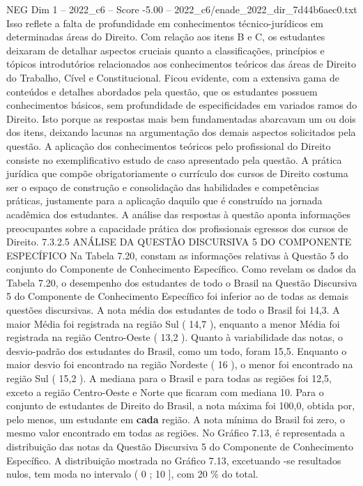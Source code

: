 \begin{textsample}{NEG Dim 1 – 2022\_c6 – Score -5.00 – 2022\_c6/enade\_2022\_dir\_7d44b6aec0.txt}
Isso reflete a falta de profundidade em conhecimentos técnico-jurídicos em determinadas áreas do Direito.
Com relação aos itens B e C, os estudantes deixaram de detalhar aspectos cruciais quanto a classificações, princípios e tópicos introdutórios relacionados aos conhecimentos teóricos das áreas de Direito do Trabalho, Cível e Constitucional.
Ficou evidente, com a extensiva gama de conteúdos e detalhes abordados pela questão, que os estudantes possuem conhecimentos básicos, sem profundidade de especificidades em variados ramos do Direito.
Isto porque as respostas mais bem fundamentadas abarcavam um ou dois dos itens, deixando lacunas na argumentação dos demais aspectos solicitados pela questão.
A aplicação dos conhecimentos teóricos pelo profissional do Direito consiste no exemplificativo estudo de caso apresentado pela questão.
A prática jurídica que compõe obrigatoriamente o currículo dos cursos de Direito costuma ser o espaço de construção e consolidação das habilidades e competências práticas, justamente para a aplicação daquilo que é construído na jornada acadêmica dos estudantes.
A análise das respostas à questão aponta informações preocupantes sobre a capacidade prática dos profissionais egressos dos cursos de Direito. 7.3.2.5 ANÁLISE DA QUESTÃO DISCURSIVA 5 DO COMPONENTE ESPECÍFICO Na Tabela 7.20, constam as informações relativas à Questão 5 do conjunto do Componente de Conhecimento Específico.
Como revelam os dados da Tabela 7.20, o desempenho dos estudantes de todo o Brasil na Questão Discursiva 5 do Componente de Conhecimento Específico foi inferior ao de todas as demais questões discursivas.
A nota média dos estudantes de todo o Brasil foi 14,3.
A maior Média foi registrada na região Sul ( 14,7 ), enquanto a menor Média foi registrada na região Centro-Oeste ( 13,2 ).
Quanto à variabilidade das notas, o desvio-padrão dos estudantes do Brasil, como um todo, foram 15,5.
Enquanto o maior desvio foi encontrado na região Nordeste ( 16 ), o menor foi encontrado na região Sul ( 15,2 ).
A mediana para o Brasil e para todas as regiões foi 12,5, exceto a região Centro-Oeste e Norte que ficaram com mediana 10.
Para o conjunto de estudantes de Direito do Brasil, a nota máxima foi 100,0, obtida por, pelo menos, um estudante em \textbf{cada} região.
A nota mínima do Brasil foi zero, o mesmo valor encontrado em todas as regiões.
No Gráfico 7.13, é representada a distribuição das notas da Questão Discursiva 5 do Componente de Conhecimento Específico.
A distribuição mostrada no Gráfico 7.13, excetuando -se resultados nulos, tem moda no intervalo ( 0 ; 10 ], com 20 \% do total.

\end{textsample}
